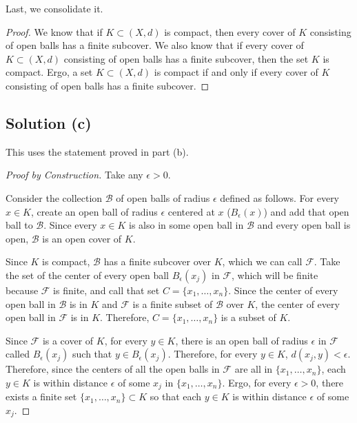 \documentclass[11pt]{article}
\begin{document}
        Last, we consolidate it.
        \begin{proof}
            We know that if $K \subset (X,d)$ is compact, then every cover of $K$ consisting of open balls has a finite subcover.
            We also know that if every cover of $K \subset (X,d)$ consisting of open balls has a finite subcover, then the set $K$ is compact.
            Ergo, a set $K \subset (X, d)$ is compact if and only if every cover of $K$ consisting of open balls has a finite subcover.
        \end{proof}

    \subsection{Solution (c)}
        This uses the statement proved in part (b).
        \begin{proof}[Proof by Construction]
            Take any $\epsilon > 0$.

            Consider the collection $\mathcal{B}$ of open balls of radius $\epsilon$ defined as follows.
            For every $x \in K$, create an open ball of radius $\epsilon$ centered at $x$ ($B_\epsilon(x)$) and add that open ball to $\mathcal{B}$.
            Since every $x \in K$ is also in some open ball in $\mathcal{B}$ and every open ball is open, $\mathcal{B}$ is an open cover of $K$.

            Since $K$ is compact, $\mathcal{B}$ has a finite subcover over $K$, which we can call $\mathcal{F}$.
            Take the set of the center of every open ball $B_\epsilon(x_j)$ in $\mathcal{F}$, which will be finite because $\mathcal{F}$ is finite, and call that set $C = \{x_1, \dots, x_n\}$.
            Since the center of every open ball in $\mathcal{B}$ is in $K$ and $\mathcal{F}$ is a finite subset of $\mathcal{B}$ over $K$, the center of every open ball in $\mathcal{F}$ is in $K$.
            Therefore, $C = \{x_1, \dots, x_n\}$ is a subset of $K$.

            Since $\mathcal{F}$ is a cover of $K$, for every $y \in K$, there is an open ball of radius $\epsilon$ in $\mathcal{F}$ called $B_\epsilon(x_j)$ such that $y \in B_\epsilon(x_j)$.
            Therefore, for every $y \in K$, $d(x_j, y) < \epsilon$.
            Therefore, since the centers of all the open balls in $\mathcal{F}$ are all in $\{x_1, \dots, x_n\}$, each $y \in K$ is within distance $\epsilon$ of some $x_j$ in $\{x_1, \dots, x_n\}$.
            Ergo, for every $\epsilon > 0$, there exists a finite set $\{x_1, \dots, x_n\} \subset K$ so that each $y \in K$ is within distance $\epsilon$ of some $x_j$.
        \end{proof}
\end{document}
